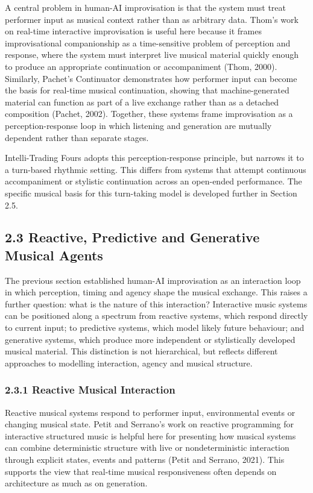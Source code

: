 A central problem in human-AI improvisation is that the system must
treat performer input as musical context rather than as arbitrary data.
Thom's work on real-time interactive improvisation is useful here
because it frames improvisational companionship as a time-sensitive
problem of perception and response, where the system must interpret live
musical material quickly enough to produce an appropriate continuation
or accompaniment (Thom, 2000). Similarly, Pachet's Continuator
demonstrates how performer input can become the basis for real-time
musical continuation, showing that machine-generated material can
function as part of a live exchange rather than as a detached
composition (Pachet, 2002). Together, these systems frame improvisation
as a perception-response loop in which listening and generation are
mutually dependent rather than separate stages.

Intelli-Trading Fours adopts this perception-response principle, but
narrows it to a turn-based rhythmic setting. This differs from systems
that attempt continuous accompaniment or stylistic continuation across
an open-ended performance. The specific musical basis for this
turn-taking model is developed further in Section 2.5.

\subsection{2.3 Reactive, Predictive and Generative Musical
Agents}\label{reactive-predictive-and-generative-musical-agents}

The previous section established human-AI improvisation as an
interaction loop in which perception, timing and agency shape the
musical exchange. This raises a further question: what is the nature of
this interaction? Interactive music systems can be positioned along a
spectrum from reactive systems, which respond directly to current input;
to predictive systems, which model likely future behaviour; and
generative systems, which produce more independent or stylistically
developed musical material. This distinction is not hierarchical, but
reflects different approaches to modelling interaction, agency and
musical structure.

\subsubsection{2.3.1 Reactive Musical
Interaction}\label{reactive-musical-interaction}

Reactive musical systems respond to performer input, environmental
events or changing musical state. Petit and Serrano's work on reactive
programming for interactive structured music is helpful here for
presenting how musical systems can combine deterministic structure with
live or nondeterministic interaction through explicit states, events and
patterns (Petit and Serrano, 2021). This supports the view that
real-time musical responsiveness often depends on architecture as much
as on generation.

